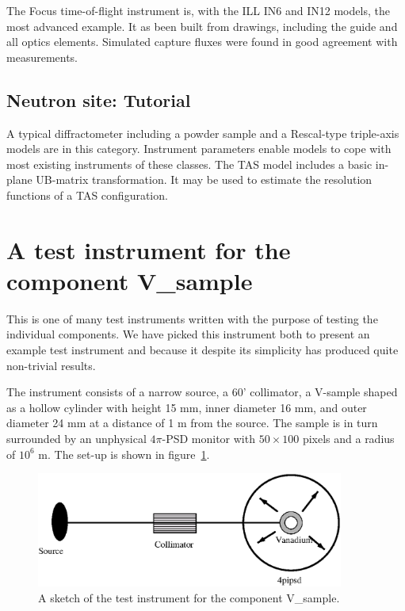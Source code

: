 The Focus time-of-flight instrument is, with the ILL IN6 and IN12 models, the most advanced example. It as been built from drawings, including the guide and all optics elements. Simulated capture fluxes were found in good agreement with measurements.

\subsection{Neutron site: Tutorial}

A typical diffractometer including a powder sample and a Rescal-type triple-axis models are in this category. Instrument parameters enable models to cope with most existing instruments of these classes. The TAS model includes a basic in-plane UB-matrix transformation. It may be used to estimate the resolution functions of a TAS configuration.

\section{A test instrument for the component V\_sample}
\label{s:V-instr}
This is one of many test instruments written with the
purpose of testing the individual components. We have picked
this instrument both to present an
example test instrument and because it despite its simplicity
has produced quite non-trivial results.

The instrument consists of a narrow source,
a 60' collimator, a V-sample shaped as a hollow cylinder
with height 15 mm, inner diameter 16 mm, and outer diameter 24 mm
at a distance of 1 m from the source.
The sample is in turn surrounded by an unphysical $4\pi$-PSD
monitor with $50 \times 100$ pixels and a radius of $10^{6}$ m.
The set-up is shown in figure~\ref{f:V-instr}.

\begin{figure}
  \begin{center}
    \includegraphics[width=0.9\textwidth]{figures/vanadium.eps}
  \end{center}
\caption{A sketch of the test instrument for the component
V\_sample.}
\label{f:V-instr}
\end{figure}

